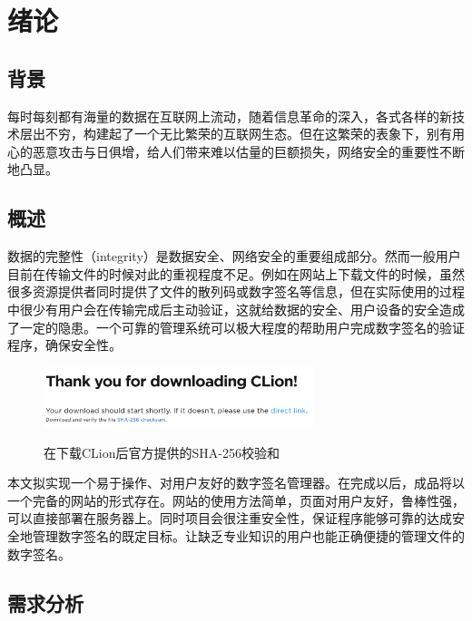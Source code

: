 
\chapter{绪论}

\section{背景}

每时每刻都有海量的数据在互联网上流动，随着信息革命的深入，各式各样的新技术层出不穷，构建起了一个无比繁荣的互联网生态。但在这繁荣的表象下，别有用心的恶意攻击与日俱增，给人们带来难以估量的巨额损失，网络安全的重要性不断地凸显。



\section{概述}

数据的完整性（integrity）是数据安全、网络安全的重要组成部分。然而一般用户目前在传输文件的时候对此的重视程度不足。例如在网站上下载文件的时候，虽然很多资源提供者同时提供了文件的散列码或数字签名等信息，但在实际使用的过程中很少有用户会在传输完成后主动验证，这就给数据的安全、用户设备的安全造成了一定的隐患。一个可靠的管理系统可以极大程度的帮助用户完成数字签名的验证程序，确保安全性。

\begin{figure}[!htb]
	\centering
	\includegraphics[width=0.7\textwidth]
	{figures/clion.png}\\
	\caption{在下载CLion后官方提供的SHA-256校验和}
	\label{fig:clion}
\end{figure}

本文拟实现一个易于操作、对用户友好的数字签名管理器。在完成以后，成品将以一个完备的网站的形式存在。网站的使用方法简单，页面对用户友好，鲁棒性强，可以直接部署在服务器上。同时项目会很注重安全性，保证程序能够可靠的达成安全地管理数字签名的既定目标。让缺乏专业知识的用户也能正确便捷的管理文件的数字签名。

\section{需求分析}

